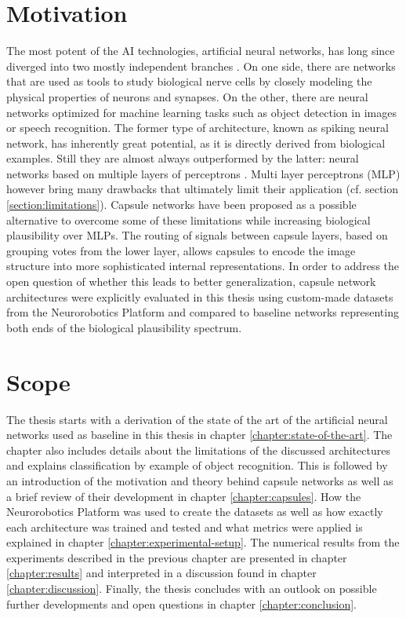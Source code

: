 \section{Motivation}
The most potent of the AI technologies, artificial neural networks, has long since diverged into two mostly independent branches \cite{krichmar2018neurorobotics}. On one side, there are networks that are used as tools to study biological nerve cells by closely modeling the physical properties of neurons and synapses. On the other, there are neural networks optimized for machine learning tasks such as object detection in images or speech recognition. The former type of architecture, known as spiking neural network, has inherently great potential, as it is directly derived from biological examples. Still they are almost always outperformed by the latter: neural networks based on multiple layers of perceptrons \cite{rosenblatt1958perceptron,rumelhart1985learning}. Multi layer perceptrons (MLP) however bring many drawbacks that ultimately limit their application (cf. section \ref{section:limitations}). Capsule networks have been proposed as a possible alternative to overcome some of these limitations while increasing biological plausibility over MLPs. The routing of signals between capsule layers, based on grouping votes from the lower layer, allows capsules to encode the image structure into more sophisticated internal representations. In order to address the open question of whether this leads to better generalization, capsule network architectures were explicitly evaluated in this thesis using custom-made datasets from the Neurorobotics Platform and compared to baseline networks representing both ends of the biological plausibility spectrum. 
\section{Scope}
The thesis starts with a derivation of the state of the art of the artificial neural networks used as baseline in this thesis in chapter \ref{chapter:state-of-the-art}. The chapter also includes details about the limitations of the discussed architectures and explains classification by example of object recognition. This is followed by an introduction of the motivation and theory behind capsule networks as well as a brief review of their development in chapter \ref{chapter:capsules}. How the Neurorobotics Platform was used to create the datasets as well as how exactly each architecture was trained and tested and what metrics were applied is explained in chapter \ref{chapter:experimental-setup}. The numerical results from the experiments described in the previous chapter are presented in chapter \ref{chapter:results} and interpreted in a discussion found in chapter \ref{chapter:discussion}. Finally, the thesis concludes with an outlook on possible further developments and open questions in chapter \ref{chapter:conclusion}.

